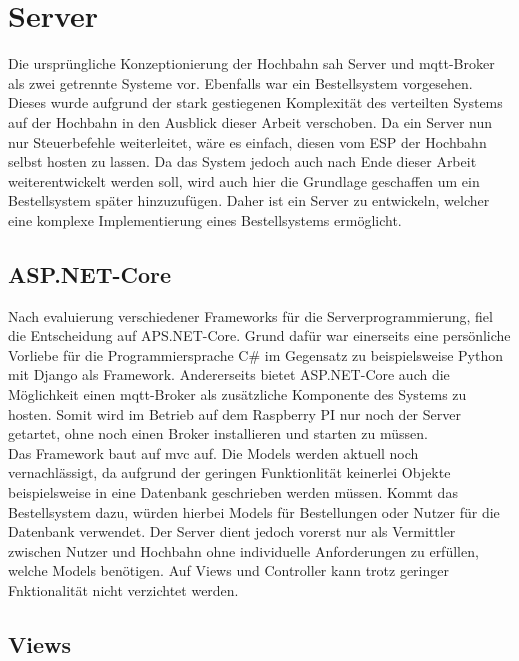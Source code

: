 \chapter{Server}
Die ursprüngliche Konzeptionierung der Hochbahn sah Server und \acrshort{mqtt}-Broker als zwei getrennte Systeme vor. Ebenfalls war ein Bestellsystem vorgesehen. Dieses wurde aufgrund der stark gestiegenen Komplexität des verteilten Systems auf der Hochbahn in den Ausblick dieser Arbeit verschoben. Da ein Server nun nur Steuerbefehle weiterleitet, wäre es einfach, diesen vom ESP der Hochbahn selbst hosten zu lassen. Da das System jedoch auch nach Ende dieser Arbeit weiterentwickelt werden soll, wird auch hier die Grundlage geschaffen um ein Bestellsystem später hinzuzufügen. Daher ist ein Server zu entwickeln, welcher eine komplexe Implementierung eines Bestellsystems ermöglicht. 
\section{ASP.NET-Core}
Nach evaluierung verschiedener Frameworks für die Serverprogrammierung, fiel die Entscheidung auf APS.NET-Core. Grund dafür war einerseits eine persönliche Vorliebe für die Programmiersprache C\# im Gegensatz zu beispielsweise Python mit Django als Framework. Andererseits bietet ASP.NET-Core auch die Möglichkeit einen \acrshort{mqtt}-Broker als zusätzliche Komponente des Systems zu hosten. Somit wird im Betrieb auf dem Raspberry PI nur noch der Server getartet, ohne noch einen Broker installieren und starten zu müssen. \\
Das Framework baut auf \acrfull{mvc} auf. Die Models werden aktuell noch vernachlässigt, da aufgrund der geringen Funktionlität keinerlei Objekte beispielsweise in eine Datenbank geschrieben werden müssen. Kommt das Bestellsystem dazu, würden hierbei Models für Bestellungen oder Nutzer für die Datenbank verwendet. Der Server dient jedoch vorerst nur als Vermittler zwischen Nutzer und Hochbahn ohne individuelle Anforderungen zu erfüllen, welche Models benötigen. Auf Views und Controller kann trotz geringer Fnktionalität nicht verzichtet werden. 

\section{Views}
